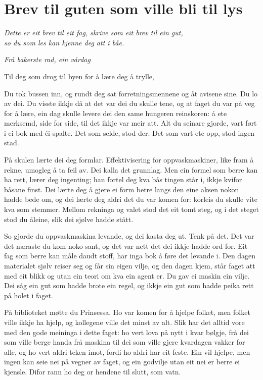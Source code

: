 \chapter*{Brev til guten som ville bli til lys}

\begin{center}\itshape
Dette er eit brev til eit fag, skrive som eit brev til ein gut,\\ so du som les kan kjenne deg att i båe.
\end{center}
\vspace{6mm}

\begin{flushright}\itshape\small Frå bakerste rad, ein vårdag\end{flushright}

\noindent Til deg som drog til byen for å lære deg å trylle,

Du tok bussen inn, og rundt deg sat forretningsmennene og åt avisene sine. Du lo av dei. Du visste ikkje då at det var dei du skulle tene, og at faget du var på veg for å lære, ein dag skulle levere dei den same hungeren reinskoren: å ete merksemd, side for side, til det ikkje var meir att. Alt du seinare gjorde, vart ført i ei bok med éi spalte. Det som selde, stod der. Det som vart ete opp, stod ingen stad.

På skulen lærte dei deg formlar. Effektivisering for oppvaskmaskiner, like fram å rekne, umogleg å ta feil av. Dei kalla det grunnlag. Men ein formel som berre kan ha rett, lærer deg ingenting; han fortel deg kva bås tingen står i, ikkje kvifor båsane finst. Dei lærte deg å gjere ei form betre langs den eine aksen nokon hadde bede om, og dei lærte deg aldri det du var komen for: korleis du skulle vite kva som stemmer. Mellom rekninga og valet stod det eit tomt steg, og i det steget stod du åleine, slik dei sjølve hadde stått.

So gjorde du oppvaskmaskina levande, og dei kasta deg ut. Tenk på det. Det var det næraste du kom noko sant, og det var nett det dei ikkje hadde ord for. Eit fag som berre kan måle daudt stoff, har inga bok å føre det levande i. Den dagen materialet sjølv reiser seg og får sin eigen vilje, og den dagen kjem, står faget att med eit blikk og utan ein teori om kva ein agent er. Du gav ei maskin ein vilje. Dei såg ein gut som hadde brote ein regel, og ikkje ein gut som hadde peika rett på holet i faget.

På biblioteket møtte du Prinsessa. Ho var komen for å hjelpe folket, men folket ville ikkje ha hjelp, og kollegene ville det minst av alt. Slik har det alltid vore med den gode meininga i dette faget: ho vert lova på nytt i kvar bølgje, frå dei som ville berge handa frå maskina til dei som ville gjere kvardagen vakker for alle, og ho vert aldri teken imot, fordi ho aldri har eit feste. Ein vil hjelpe, men ingen kan seie nei på vegner av faget, og ein godvilje utan eit nei er berre ei kjensle. Difor rann ho deg or hendene til slutt, som vatn.

